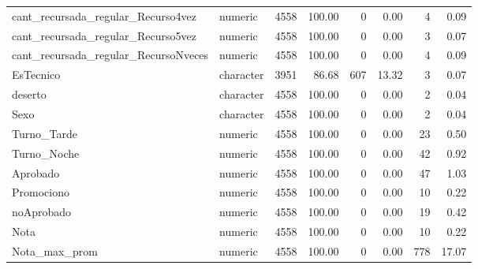 \begin{table}[!h]
{\begin{tabular}[t]{llrrrrrr}
			cant\_recursada\_regular\_Recurso4vez & numeric & 4558 & 100.00 & 0 & 0.00 & 4 & 0.09\\
			\rowcolor{gray!6}  cant\_recursada\_regular\_Recurso5vez & numeric & 4558 & 100.00 & 0 & 0.00 & 3 & 0.07\\
			\addlinespace
			cant\_recursada\_regular\_RecursoNveces & numeric & 4558 & 100.00 & 0 & 0.00 & 4 & 0.09\\
			\rowcolor{gray!6}  EsTecnico & character & 3951 & 86.68 & 607 & 13.32 & 3 & 0.07\\
			deserto & character & 4558 & 100.00 & 0 & 0.00 & 2 & 0.04\\
			\rowcolor{gray!6}  Sexo & character & 4558 & 100.00 & 0 & 0.00 & 2 & 0.04\\
			Turno\_Tarde & numeric & 4558 & 100.00 & 0 & 0.00 & 23 & 0.50\\
			\addlinespace
			\rowcolor{gray!6}  Turno\_Noche & numeric & 4558 & 100.00 & 0 & 0.00 & 42 & 0.92\\
			Aprobado & numeric & 4558 & 100.00 & 0 & 0.00 & 47 & 1.03\\
			\rowcolor{gray!6}  Promociono & numeric & 4558 & 100.00 & 0 & 0.00 & 10 & 0.22\\
			noAprobado & numeric & 4558 & 100.00 & 0 & 0.00 & 19 & 0.42\\
			\rowcolor{gray!6}  Nota & numeric & 4558 & 100.00 & 0 & 0.00 & 10 & 0.22\\
			\addlinespace
			Nota\_max\_prom & numeric & 4558 & 100.00 & 0 & 0.00 & 778 & 17.07\\
			\bottomrule
	\end{tabular}}
\end{table}
